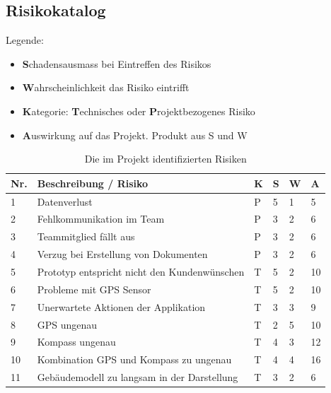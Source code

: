\documentclass[a4paper]{scrreprt}
\begin{document}
\subsection{Risikokatalog}
\label{sssec:Risikokatalog}
Legende:
\begin{itemize}
	\item \textbf{S}chadensausmass bei Eintreffen des Risikos
	\item \textbf{W}ahrscheinlichkeit das Risiko eintrifft
	\item \textbf{K}ategorie: \textbf{T}echnisches oder \textbf{P}rojektbezogenes Risiko
	\item \textbf{A}uswirkung auf das Projekt. Produkt aus S und W
\end{itemize}

\vspace{1em}
\noindent
\begin{table}[htb]
	\begin{tabularx}{\textwidth}{|l|X|l|l|l||l|}
		\hline
		\textbf{Nr.} & \textbf{Beschreibung / Risiko} & \textbf{K} & \textbf{S} & \textbf{W} & \textbf{A} \\
		\hline
		1 & Datenverlust & P & 5 & 1 & 5\\
		\hline
		2 & Fehlkommunikation im Team & P & 3 & 2 & 6 \\
		\hline
		3 & Teammitglied fällt aus & P & 3 & 2 & 6 \\
		\hline
		4 & Verzug bei Erstellung von Dokumenten & P & 3 & 2 & 6 \\
		\hline
		5 & Prototyp entspricht nicht den Kundenwünschen & T & 5 & 2 & 10 \\
		\hline
		6 & Probleme mit GPS Sensor & T & 5 & 2 & 10 \\
		\hline
		7 & Unerwartete Aktionen der Applikation & T & 3 & 3 & 9\\
		\hline
		8 & GPS ungenau & T & 2 & 5 & 10\\
		\hline
		9 & Kompass ungenau & T & 4 & 3 & 12\\
		\hline
		10 & Kombination GPS und Kompass zu ungenau & T & 4 & 4 & 16\\
		\hline
		11 & Gebäudemodell zu langsam in der Darstellung & T & 3 & 2 & 6\\
		\hline
	\end{tabularx}
	\caption{Die im Projekt identifizierten Risiken}
\end{table}

\vspace{1em}
\end{document}
